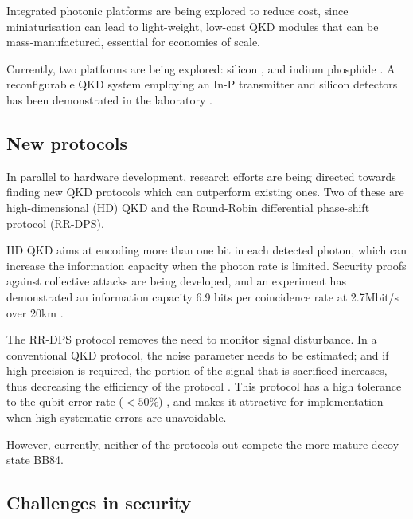 Integrated photonic platforms are being explored to reduce cost, since miniaturisation can lead to light-weight, low-cost QKD modules that can be mass-manufactured, essential for economies of scale. 

Currently, two platforms are being explored: silicon \cite{bib:lim2014review}, and indium phosphide \cite{bib:smit2014introduction}. A reconfigurable QKD system employing an In-P transmitter and silicon detectors has been demonstrated in the laboratory \cite{bib:sibson2017chip}.

\subsection{New protocols}

In parallel to hardware development, research efforts are being directed towards finding new QKD protocols which can outperform existing ones. Two of these are high-dimensional (HD) QKD and the Round-Robin differential phase-shift protocol (RR-DPS).

HD QKD aims at encoding more than one bit in each detected photon, which can increase the information capacity when the photon rate is limited. Security proofs against collective attacks are being developed, and an experiment has demonstrated an information capacity 6.9 bits per coincidence rate at 2.7Mbit/s over 20km \cite{bib:zhong2015photon}.

The RR-DPS protocol \cite{bib:sasaki2014practical} removes the need to monitor signal disturbance. In a conventional QKD protocol, the noise parameter needs to be estimated; and if high precision is required, the portion of the signal that is sacrificed increases, thus decreasing the efficiency of the protocol \cite{bib:cai2009finite, bib:hayashi2014security}. This protocol has a high tolerance to the qubit error rate ($< 50\%$) \cite{bib:xu2015discrete}, and makes it attractive for implementation when high systematic errors are unavoidable.   

However, currently, neither of the protocols out-compete the more mature decoy-state BB84.

\subsection{Challenges in security}

